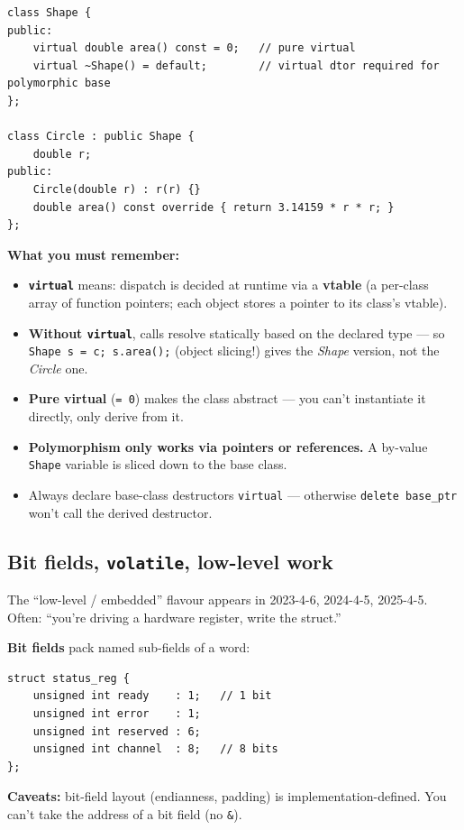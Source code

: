 \documentclass[11pt,a4paper]{article}
\begin{document}
\begin{lstlisting}
class Shape {
public:
    virtual double area() const = 0;   // pure virtual
    virtual ~Shape() = default;        // virtual dtor required for polymorphic base
};

class Circle : public Shape {
    double r;
public:
    Circle(double r) : r(r) {}
    double area() const override { return 3.14159 * r * r; }
};
\end{lstlisting}

\textbf{What you must remember:}
\begin{itemize}[leftmargin=*,itemsep=1pt]
  \item \textbf{\texttt{virtual}} means: dispatch is decided at runtime via a \textbf{vtable} (a per-class array of function pointers; each object stores a pointer to its class's vtable).
  \item \textbf{Without \texttt{virtual}}, calls resolve statically based on the declared type --- so \verb|Shape s = c; s.area();| (object slicing!) gives the \emph{Shape} version, not the \emph{Circle} one.
  \item \textbf{Pure virtual} (\verb|= 0|) makes the class abstract --- you can't instantiate it directly, only derive from it.
  \item \textbf{Polymorphism only works via pointers or references.} A by-value \verb|Shape| variable is sliced down to the base class.
  \item Always declare base-class destructors \verb|virtual| --- otherwise \verb|delete base_ptr| won't call the derived destructor.
\end{itemize}

\subsection{Bit fields, \texttt{volatile}, low-level work}

\begin{useful}
The ``low-level / embedded'' flavour appears in 2023-4-6, 2024-4-5, 2025-4-5. Often: ``you're driving a hardware register, write the struct.''
\end{useful}

\textbf{Bit fields} pack named sub-fields of a word:

\begin{lstlisting}
struct status_reg {
    unsigned int ready    : 1;   // 1 bit
    unsigned int error    : 1;
    unsigned int reserved : 6;
    unsigned int channel  : 8;   // 8 bits
};
\end{lstlisting}
\textbf{Caveats:} bit-field layout (endianness, padding) is implementation-defined. You can't take the address of a bit field (no \verb|&|).
\end{document}
